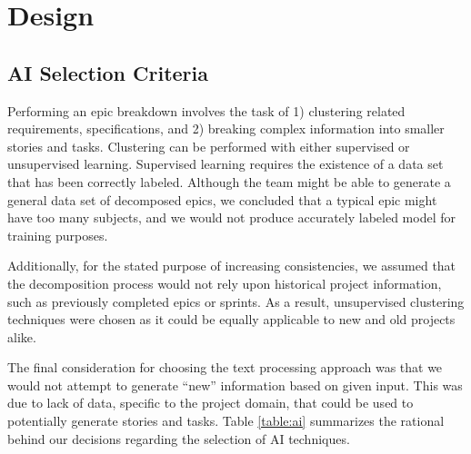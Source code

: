 \section{Design}
\label{design}

\subsection{AI Selection Criteria}
\label{subsection:criteria}
Performing an epic breakdown involves the task of 1) clustering related requirements, specifications, and 2) breaking complex information into smaller stories and tasks. Clustering can be performed with either supervised or unsupervised learning. Supervised learning requires the existence of a data set that has been correctly labeled. Although the team might be able to generate a general data set of decomposed epics, we concluded that a typical epic might have too many subjects, and we would not produce accurately labeled model for training purposes. 

Additionally, for the stated purpose of increasing consistencies, we assumed that the decomposition process would not rely upon historical project information, such as previously completed epics or sprints. As a result, unsupervised clustering techniques were chosen as it could be equally applicable to new and old projects alike.

The final consideration for choosing the text processing approach was that we would not attempt to generate ``new'' information based on given input. This was due to  lack of data, specific to the project domain, that could be used to potentially generate stories and tasks. Table \ref{table:ai} summarizes the rational behind our decisions regarding the selection of AI techniques.

